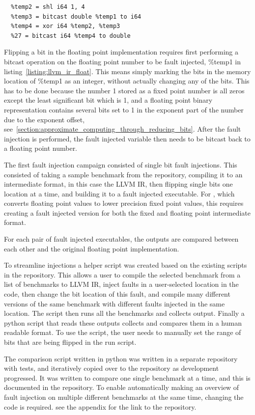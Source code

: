 \begin{lstlisting}[caption=floating point bit flip in LLVM bytecode, label=listing:llvm_ir_float]
  %temp1 = fdiv double %24, %26
  %temp2 = shl i64 1, 4
  %temp3 = bitcast double %temp1 to i64
  %temp4 = xor i64 %temp2, %temp3
  %27 = bitcast i64 %temp4 to double
\end{lstlisting}

Flipping a bit in the floating point implementation requires first performing a bitcast operation on the floating point number to be fault injected, \%temp1 in listing~\ref{listing:llvm_ir_float}. This means simply marking the bits in the memory location of \%temp1 as an integer, without actually changing any of the bits. This has to be done because the number 1 stored as a fixed point number is all zeros except the least significant bit which is 1, and a floating point binary representation contains several bits set to 1 in the exponent part of the number due to the exponent offset, see~\ref{section:approximate_computing_through_reducing_bits}. After the fault injection is performed, the fault injected variable then needs to be bitcast back to a floating point number.

The first fault injection campaign consisted of single bit fault injections. This consisted of taking a sample benchmark from the \taffo{} repository, compiling it to an intermediate format, in this case the LLVM IR, then flipping single bits one location at a time, and building it to a fault injected executable. For \taffo{}, which converts floating point values to lower precision fixed point values, this requires creating a fault injected version for both the fixed and floating point intermediate format.

For each pair of fault injected executables, the outputs are compared between each other and the original floating point implementation.

To streamline injections a helper script was created based on the existing scripts in the \taffo{} repository. This allows a user to compile the selected benchmark from a list of benchmarks to LLVM IR, inject faults in a user-selected location in the code, then change the bit location of this fault, and compile many different versions of the same benchmark with different faults injected in the same location. The script then runs all the benchmarks and collects output. Finally a python script that reads these outputs collects and compares them in a human readable format. To use the script, the user needs to manually set the range of bits that are being flipped in the run script. 

The comparison script written in python was written in a separate repository with tests, and iteratively copied over to the \taffo{} repository as development progressed. It was written to compare one single benchmark at a time, and this is documented in the repository. To enable automatically making an overview of fault injection on multiple different benchmarks at the same time, changing the code is required. see the appendix for the link to the repository.




